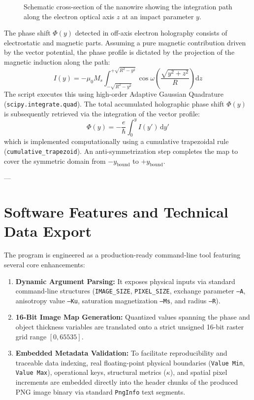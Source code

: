 \documentclass[11pt,a4paper]{article}
\newcommand{\dd}{\mathrm{d}}
\newcommand{\kappaadim}{\kappa}
\begin{document}
\begin{figure}[h]
    \centering
    \label{fig:schematic}
    \caption{Schematic cross-section of the nanowire showing the integration path along the electron optical axis $z$ at an impact parameter $y$.}
\end{figure}

The phase shift $\Phi(y)$ detected in off-axis electron holography consists of electrostatic and magnetic parts. Assuming a pure magnetic contribution driven by the vector potential, the phase profile is dictated by the projection of the magnetic induction along the path:
\begin{equation}
    I(y) = -\mu_0 M_s \int_{-\sqrt{R^2-y^2}}^{+\sqrt{R^2-y^2}} \cos\omega\left(\frac{\sqrt{y^2+z^2}}{R}\right) \dd z
\end{equation}
The script executes this using high-order Adaptive Gaussian Quadrature (\texttt{scipy.integrate.quad}). The total accumulated holographic phase shift $\Phi(y)$ is subsequently retrieved via the integration of the vector profile:
\begin{equation}
    \Phi(y) = -\frac{e}{\hbar} \int_0^y I(y') \,\dd y'
\end{equation}
which is implemented computationally using a cumulative trapezoidal rule (\texttt{cumulative\_trapezoid}). An anti-symmetrization step completes the map to cover the symmetric domain from $-y_{\text{bound}}$ to $+y_{\text{bound}}$.

---

\section{Software Features and Technical Data Export}

The program is engineered as a production-ready command-line tool featuring several core enhancements:
\begin{enumerate}
    \item \textbf{Dynamic Argument Parsing:} It exposes physical inputs via standard command-line structures (\texttt{IMAGE\_SIZE}, \texttt{PIXEL\_SIZE}, exchange parameter \texttt{--A}, anisotropy value \texttt{--Ku}, saturation magnetization \texttt{--Ms}, and radius \texttt{--R}).
    \item \textbf{16-Bit Image Map Generation:} Quantized values spanning the phase and object thickness variables are translated onto a strict unsigned 16-bit raster grid range $[0, 65535]$.
    \item \textbf{Embedded Metadata Validation:} To facilitate reproducibility and traceable data indexing, real floating-point physical boundaries (\texttt{Value Min}, \texttt{Value Max}), operational keys, structural metrics ($\kappaadim$), and spatial pixel increments are embedded directly into the header chunks of the produced PNG image binary via standard \texttt{PngInfo} text segments.
\end{enumerate}
\end{document}
